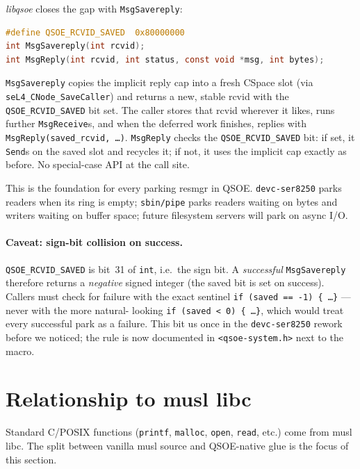 \emph{libqsoe} closes the gap with \texttt{MsgSavereply}:

\begin{lstlisting}[language=C]
#define QSOE_RCVID_SAVED  0x80000000
int MsgSavereply(int rcvid);
int MsgReply(int rcvid, int status, const void *msg, int bytes);
\end{lstlisting}

\texttt{MsgSavereply} copies the implicit reply cap into a fresh
CSpace slot (via \texttt{seL4\_CNode\_SaveCaller}) and returns a new,
stable rcvid with the \texttt{QSOE\_RCVID\_SAVED} bit set.  The caller
stores that rcvid wherever it likes, runs further \texttt{MsgReceive}s,
and when the deferred work finishes, replies with
\texttt{MsgReply(saved\_rcvid, \ldots)}.  \texttt{MsgReply} checks the
\texttt{QSOE\_RCVID\_SAVED} bit: if set, it \texttt{Send}s on the saved
slot and recycles it; if not, it uses the implicit cap exactly as
before.  No special-case API at the call site.

This is the foundation for every parking resmgr in QSOE.
\texttt{devc-ser8250} parks readers when its ring is empty;
\texttt{sbin/pipe} parks readers waiting on bytes and writers waiting
on buffer space; future filesystem servers will park on async I/O.

\paragraph{Caveat: sign-bit collision on success.}
\texttt{QSOE\_RCVID\_SAVED} is bit~31 of \texttt{int}, i.e.\ the sign
bit.  A \emph{successful} \texttt{MsgSavereply} therefore returns a
\emph{negative} signed integer (the saved bit is set on success).
Callers must check for failure with the exact sentinel
\texttt{if (saved == -1) \{ \ldots \}} — never with the more natural-
looking \texttt{if (saved < 0) \{ \ldots \}}, which would treat every
successful park as a failure.  This bit us once in the
\texttt{devc-ser8250} rework before we noticed; the rule is now
documented in \texttt{<qsoe-system.h>} next to the macro.

\section{Relationship to musl libc}

Standard C/POSIX functions (\texttt{printf}, \texttt{malloc},
\texttt{open}, \texttt{read}, etc.) come from musl libc.  The split
between vanilla musl source and QSOE-native glue is the focus of this
section.

